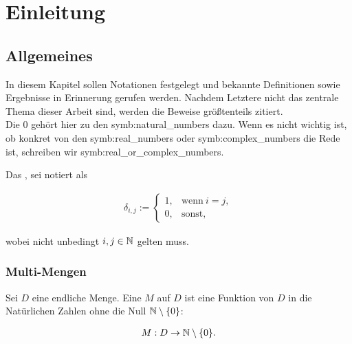 \chapter{Einleitung} \label{chap:introduction}

    \section{Allgemeines}

        In diesem Kapitel sollen Notationen festgelegt und bekannte Definitionen sowie Ergebnisse in Erinnerung gerufen werden.
        Nachdem Letztere nicht das zentrale Thema dieser Arbeit sind, werden die Beweise größtenteils zitiert. \\

        Die $0$ gehört hier zu den  \gls{symb:natural_numbers} dazu.
        Wenn es nicht wichtig ist, ob konkret von den  \gls{symb:real_numbers} oder  \gls{symb:complex_numbers} die Rede ist, schreiben wir \gls{symb:real_or_complex_numbers}.

        Das , sei notiert als

        \begin{align*}
            \delta_{i, j}
            :=
            \begin{cases}
                1, & \text{wenn} ~ i = j, \\
                0, & \text{sonst},
            \end{cases}
        \end{align*}

        wobei nicht unbedingt $i, j \in \mathbb N$ gelten muss.

        \subsection{Multi-Mengen}

            \begin{definition}

                Sei $D$ eine endliche Menge.
                Eine  $M$ auf $D$ ist eine Funktion von $D$ in die Natürlichen Zahlen ohne die Null $\mathbb N \setminus {\left \{ 0 \right \}}$:

                \begin{align*}
                    M: D \to \mathbb N \setminus {\left \{ 0 \right \}}.
                \end{align*}

            \end{definition}
            
